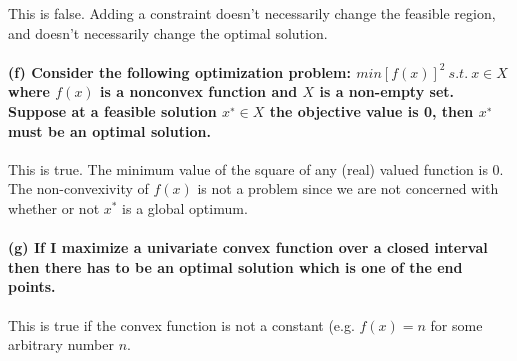 \documentclass[11pt]{article}
\begin{document}
This is false. Adding a constraint doesn't necessarily change the
feasible region, and doesn't necessarily change the optimal solution.

\hypertarget{f-consider-the-following-optimization-problem-minfx2-s.t.-x-in-x-where-fx-is-a-nonconvex-function-and-x-is-a-non-empty-set.-suppose-at-a-feasible-solution-x-in-x-the-objective-value-is-0-then-x-must-be-an-optimal-solution.}{%
\paragraph{\texorpdfstring{(f) Consider the following optimization
problem: \(min[f(x)]^2 \ s.t. \ x \in X\) where \(f(x)\) is a nonconvex
function and \(X\) is a non-empty set. Suppose at a feasible solution
\(x^∗ \in X\) the objective value is 0, then \(x^∗\) must be an optimal
solution.}{(f) Consider the following optimization problem: min{[}f(x){]}\^{}2 \textbackslash{} s.t. \textbackslash{} x \textbackslash{}in X where f(x) is a nonconvex function and X is a non-empty set. Suppose at a feasible solution x\^{}∗ \textbackslash{}in X the objective value is 0, then x\^{}∗ must be an optimal solution.}}\label{f-consider-the-following-optimization-problem-minfx2-s.t.-x-in-x-where-fx-is-a-nonconvex-function-and-x-is-a-non-empty-set.-suppose-at-a-feasible-solution-x-in-x-the-objective-value-is-0-then-x-must-be-an-optimal-solution.}}

This is true. The minimum value of the square of any (real) valued
function is 0. The non-convexivity of \(f(x)\) is not a problem since we
are not concerned with whether or not \(x^*\) is a global optimum.

\hypertarget{g-if-i-maximize-a-univariate-convex-function-over-a-closed-interval-then-there-has-to-be-an-optimal-solution-which-is-one-of-the-end-points.}{%
\paragraph{(g) If I maximize a univariate convex function over a closed
interval then there has to be an optimal solution which is one of the
end
points.}\label{g-if-i-maximize-a-univariate-convex-function-over-a-closed-interval-then-there-has-to-be-an-optimal-solution-which-is-one-of-the-end-points.}}

This is true if the convex function is not a constant (e.g. \(f(x) = n\)
for some arbitrary number \(n\).


    
    
    
    
\end{document}
